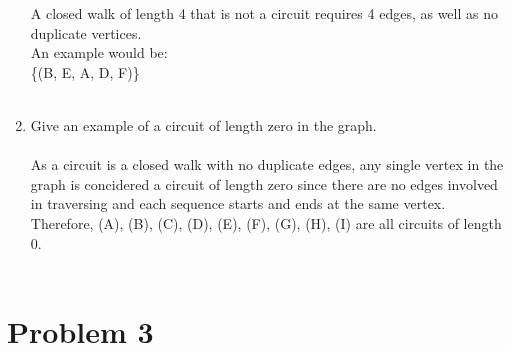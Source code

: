 \documentclass{amsart}
\theoremstyle{definition}
\theoremstyle{Exercise}
\theoremstyle{remark}
\theoremstyle{rule}
\numberwithin{equation}{section}
\begin{document}
\begin{enumerate}[label=(\roman*)]
           A closed walk of length 4 that is not a circuit requires 4 edges, as well as no duplicate vertices.\\
           An example would be:\\
           \{(B, E, A, D, F)\}
\\\\
        \item Give an example of a circuit of length zero in the graph.\\\\
           As a circuit is a closed walk with no duplicate edges, any single vertex in the graph is concidered a circuit of length zero
           since there are no edges involved in traversing and each sequence starts and ends at the same vertex.\\
           Therefore, (A), (B), (C), (D), (E), (F), (G), (H), (I) are all circuits of length 0.
\\\\
    \end{enumerate}
    \newpage
    

\vspace*{0.2in}
\section*{Problem 3}
\end{document}
